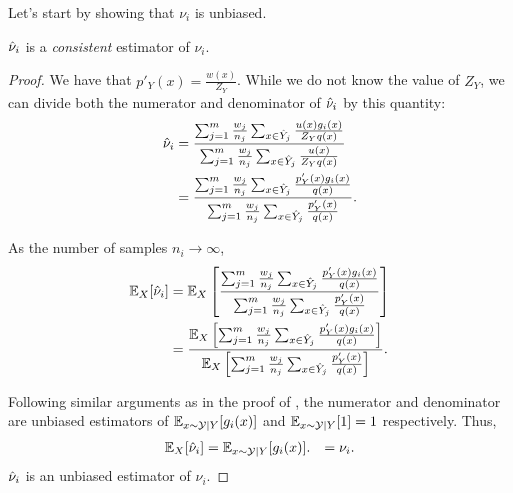 Let's start by showing that $\nu_i$ is unbiased.
\begin{theorem}
\label{thm:nuh}
  ${\hat{\nu}}_i$ is a \textit{consistent} estimator of $\nu_i$.
\end{theorem}
\begin{proof}
  We have that $p'_Y(x) = \frac{w(x)}{Z_Y}$.
  While we do not know the value of $Z_Y$, we can divide both the numerator and denominator of ${\hat{\nu}}_i$ by this quantity:
  \begin{align*}
    {\hat{\nu}}_i 
    &= \frac{\sum_{j=1}^m \frac{w_j}{n_j} \sum_{x \in {\hat{Y}}_j} \frac{u(x) g_i(x)}{Z_Y q(x)}}{\sum_{j=1}^m \frac{w_j}{n_j} \sum_{x \in {\hat{Y}}_j} \frac{u(x)}{Z_Y q(x)}} \\
    &= \frac{\sum_{j=1}^m \frac{w_j}{n_j} \sum_{x \in {\hat{Y}}_j} \frac{p'_Y(x) g_i(x)}{q(x)}}{\sum_{j=1}^m \frac{w_j}{n_j} \sum_{x \in {\hat{Y}}_j} \frac{p'_Y(x)}{q(x)}}.
  \end{align*}

  As the number of samples $n_i \to \infty$,
  \begin{align*}
    \mathbb{E}_{X}[{\hat{\nu}}_i] 
    &= \mathbb{E}_{X}\left[ \frac{\sum_{j=1}^m \frac{w_j}{n_j} \sum_{x \in {\hat{Y}}_j} \frac{p'_Y(x) g_i(x)}{q(x)}}{\sum_{j=1}^m \frac{w_j}{n_j} \sum_{x \in {\hat{Y}}_j} \frac{p'_Y(x)}{q(x)}} \right] \\
    &= \frac{\mathbb{E}_{X}\left[ \sum_{j=1}^m \frac{w_j}{n_j} \sum_{x \in {\hat{Y}}_j} \frac{p'_Y(x) g_i(x)}{q(x)} \right]}
    {\mathbb{E}_{X}\left[\sum_{j=1}^m \frac{w_j}{n_j} \sum_{x \in {\hat{Y}}_j} \frac{p'_Y(x)}{q(x)}\right]}.
  \end{align*}

  Following similar arguments as in the proof of , the numerator and denominator are unbiased estimators of $\mathbb{E}_{x \sim \mathcal{Y} \mid Y}[g_i(x)]$ and $\mathbb{E}_{x \sim \mathcal{Y} \mid Y}[1] = 1$ respectively.
  Thus,
  \begin{align*}
    \mathbb{E}_{X}[{\hat{\nu}}_i] 
    &= \mathbb{E}_{x \sim \mathcal{Y} \mid Y}[g_i(x)].
    &= \nu_i.
  \end{align*}
  ${\hat{\nu}}_i$ is an unbiased estimator of $\nu_i$.

\end{proof}

